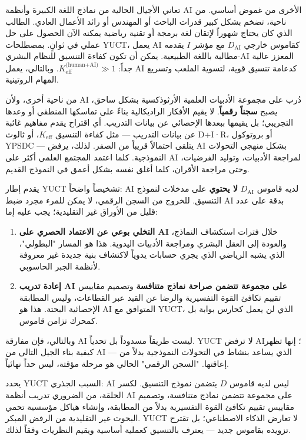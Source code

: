 \documentclass[12pt,a4paper]{article}
\begin{document}
	تعاني الأجيال الحالية من نماذج اللغة الكبيرة وأنظمة AI الأخرى من غموض أساسي. من ناحية، تضخم بشكل كبير قدرات الباحث أو المهندس أو رائد الأعمال العادي. الطالب الذي كان يحتاج شهوراً لإتقان لغة برمجة أو تقنية رياضية يمكنه الآن الحصول على حل عملي في ثوانٍ. بمصطلحات YUCT، يعمل AI كقاموس خارجي \(D_{\text{AI}}\) مع مؤشر \(I\) يقدمه مطالبة باللغة الطبيعية. يمكن أن تكون كفاءة التنسيق للنظام البشري-AI المعزز عالية جداً: \(K_{\mathrm{eff}}^{\text{(human+AI)}} \gg 1\). وبالتالي، يعمل AI كدعامة تنسيق قوية، لتسوية الملعب وتسريع المهام الروتينية.
	
	من ناحية أخرى، ولأن AI دُرب على مجموعة الأدبيات العلمية الأرثوذكسية بشكل ساحق، يصبح \textbf{سجناً رقمياً}. لا يقيم الأفكار الراديكالية بناءً على تماسكها المنطقي أو وعدها التجريبي؛ بل يقيمها ببعدها الإحصائي عن بيانات التدريب. أي اقتراح يقدم مفاهيم غائبة عن بيانات التدريب — مثل كفاءة التنسيق \(K_{\mathrm{eff}}\)، أو ثالوث D+I·R، أو بروتوكول YPSDC — يتلقى احتمالاً قريباً من الصفر. لذلك، يرفض AI بشكل منهجي التحولات النموذجية. كلما اعتمد المجتمع العلمي أكثر على AI لمراجعة الأدبيات، وتوليد الفرضيات، وحتى مراجعة الأقران، كلما أغلق نفسه بشكل أعمق في النموذج القديم.
	
	يقدم إطار YUCT تشخيصاً واضحاً: AI لديه قاموس \(D_{\text{AI}}\) \textbf{لا يحتوي} على مدخلات لنموذج التنسيق. للخروج من السجن الرقمي، لا يمكن للمرء مجرد ضبط AI بدقة على عدد قليل من الأوراق غير التقليدية؛ يجب عليه إما:
	
	\begin{enumerate}
		\item \textbf{التخلي بوعي عن الاعتماد الحصري على AI} خلال فترات استكشاف النماذج، والعودة إلى العقل البشري ومراجعة الأدبيات اليدوية. هذا هو المسار "البطولي"، الذي يشبه الرياضي الذي يجري حسابات يدوياً لاكتشاف بنية جديدة غير معروفة لأنظمة الجبر الحاسوبي.
		\item \textbf{إعادة تدريب AI على مجموعة تتضمن صراحة نماذج متنافسة} وتصميم مقاييس تقييم تكافئ القوة التفسيرية والرضا عن القيد عبر القطاعات، وليس المطابقة الإحصائية البحتة. هذا هو AI المتوافق مع YUCT، الذي لن يعمل كحارس بوابة بل كمحرك تزامن قاموس.
	\end{enumerate}
	
	وبالتالي، فإن مفارقة AI ليست طريقاً مسدوداً بل تحدياً. YUCT لا ترفض AI؛ إنها تظهر كيفية بناء الجيل التالي من AI — الذي يساعد بنشاط في التحولات النموذجية بدلاً من إعاقتها. "السجن الرقمي" الحالي هو مرحلة مؤقتة، ليس حداً نهائياً.
	
	يحدد YUCT السبب الجذري: AI ليس لديه قاموس \(D\) يتضمن نموذج التنسيق. لكسر الحلقة، من الضروري تدريب أنظمة AI على مجموعة تتضمن نماذج متنافسة، وتصميم مقاييس تقييم تكافئ القوة التفسيرية بدلاً من المطابقة، وإنشاء هياكل مؤسسية تحمي البحوث غير التقليدية من الرفض المبكر. YUCT لا تعارض الذكاء الاصطناعي؛ بل تقترح تزويده بقاموس جديد — يعترف بالتنسيق كعملية أساسية ويقيم النظريات وفقاً لذلك.
	
\end{document}
